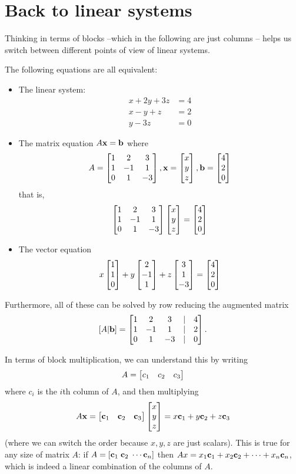 \section{Back to linear systems}
Thinking in terms of blocks --which in the following are just columns -- helps us switch between different points 
of view of linear systems.

The following equations are all equivalent:
\begin{itemize}
\item The linear system:
\begin{align*}
x+2y+3z &= 4\\
x-y+z &=2\\
 y-3z&=0
\end{align*}
\item The matrix equation $A\mathbf{x} = \mathbf{b}$ where 
$$
A = \left[ \begin{matrix} 1 & 2 & 3\\ 1 & -1 & 1\\ 0 & 1 & -3 \end{matrix} \right], \mathbf{x} = \left[ \begin{matrix} x\\y\\z \end{matrix} \right], \mathbf{b}=\left[ \begin{matrix} 4\\2\\0 \end{matrix} \right]
$$
that is,
$$
\left[ \begin{matrix} 1 & 2 & 3\\ 1 & -1 & 1\\ 0 & 1 & -3 \end{matrix} \right]\left[ \begin{matrix} x\\y\\z \end{matrix} \right]=\left[ \begin{matrix} 4\\2\\0 \end{matrix} \right]
$$
\item The vector equation 
$$
x\left[ \begin{matrix} 1\\1\\0 \end{matrix} \right] + y\left[ \begin{matrix} 2\\-1\\1 \end{matrix} \right] + z\left[ \begin{matrix} 3\\1\\-3 \end{matrix} \right]  =\left[ \begin{matrix} 4\\2\\0 \end{matrix} \right]
$$
\end{itemize}
Furthermore, all of these can be solved by row reducing the augmented
matrix 
$$
[A|\mathbf{b}] =  \left[ \begin{matrix} 1 & 2 & 3&|& 4\\ 1 & -1 & 1&|&2\\ 0 & 1 & -3&|&0 \end{matrix} \right].
$$

In terms of block multiplication, we can understand this by 
writing
$$
A = \left[ \begin{matrix} c_1 & c_2 & c_3 \end{matrix} \right]
$$
where $c_i$ is the $i$th column of $A$, and then
multiplying
$$
A\mathbf{x}= \left[ \begin{matrix} \mathbf{c}_1 & \mathbf{c}_2 & \mathbf{c}_3 \end{matrix} \right]\left[ \begin{matrix} x\\y\\z \end{matrix} \right] = x\mathbf{c}_1 + y\mathbf{c}_2 + z\mathbf{c}_3
$$
(where we can switch the order because $x,y,z$ are just scalars).
This is true for any size of matrix $A$: if $A = [\mathbf{c}_1 \;\mathbf{c}_2 \; \cdots \mathbf{c}_n]$
then $Ax = x_1\mathbf{c}_1 + x_2\mathbf{c}_2 + \cdots + x_n\mathbf{c}_n$, which is indeed
a linear combination of the columns of $A$.

